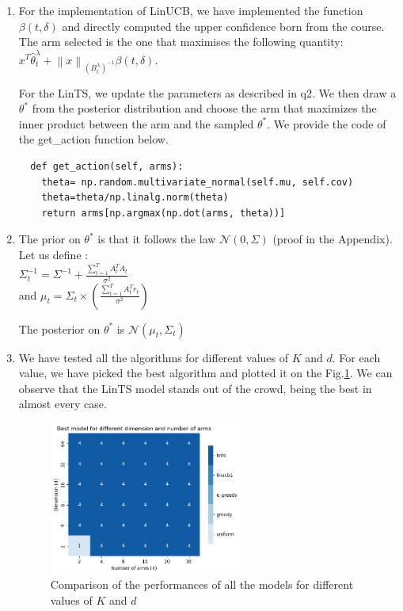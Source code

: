 \begin{enumerate}
    \item For the implementation of LinUCB, we have implemented the function $\beta(t,\delta)$ and directly computed the upper confidence born from the course. The arm selected is the one that maximises the following quantity: \\
     $x^T\hat{\theta }^\lambda _t + \left\lVert x\right\rVert _{(B_t^\lambda)^{-1} } \beta(t, \delta) $. 

    For the LinTS, we update the parameters as described in q2. We then draw a $\theta^*$ from the posterior distribution and choose the arm that maximizes the inner product between the arm and the sampled $\theta^*$.
    We provide the code of the get\_action function below.\\[0.3cm]
    \begin{lstlisting}
  def get_action(self, arms):
    theta= np.random.multivariate_normal(self.mu, self.cov)
    theta=theta/np.linalg.norm(theta)
    return arms[np.argmax(np.dot(arms, theta))]
    \end{lstlisting}
    \item The prior on $\theta^*$ is that it follows the law $\mathcal{N}(0, \Sigma)$ (proof in the Appendix). \\
    
Let us define : \\
$\Sigma_t ^{-1} = \Sigma^{-1} + \frac{\sum_{t=1}^{T} A_t^T A_t}{\sigma^2}$ \\

and $\mu_t = \Sigma_t \times (\frac{\sum_{t=1}^{T} A_t^T r_t}{\sigma^2})$


The posterior on  $\theta^*$ is  $\mathcal{N}(\mu_t, \Sigma_t)$
    \item We have tested all the algorithms for different values of $K$ and $d$. For each value, we have picked the best algorithm and plotted it on the Fig.\ref{fig:best_models}. 
    We can observe that the LinTS model stands out of the crowd, being the best in almost every case. 

    \begin{figure}[h]
        \centering
        \includegraphics[width=0.6\textwidth]{images/best_model.png}
        \caption{Comparison of the performances of all the models for different values of $K$ and $d$}
        \label{fig:best_models}
    \end{figure}
\end{enumerate}

